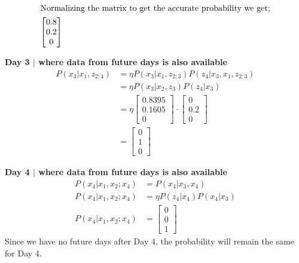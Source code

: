 \documentclass[answers]{exam}
\begin{document}
\begin{questions}
\begin{parts}
\begin{solution}
            \begin{align*} 
                \intertext{Normalizing the matrix to get the accurate probability we get;} 
                \begin{bmatrix} 0.8 \\ 0.2 \\ 0 \end{bmatrix}               
            \end{align*}
            
            \textbf{Day 3 $\mid$ where data from future days is also available}
            \begin{align*}
                P(x_3 | x_1, z_{2:4}) &= \eta P(x_3 | x_1, z_{2:3})P(z_4 | x_3, x_1, z_{2:3}) \\
                &= \eta P(x_3 | x_2, z_3)P(z_4 | x_3) \\
                &= \eta \begin{bmatrix}
                0.8395 \\
                0.1605 \\
                0
                \end{bmatrix} \cdot \begin{bmatrix}
                0 \\
                0.2 \\
                0
                \end{bmatrix} \\
                &= \begin{bmatrix}
                0 \\
                1 \\
                0
                \end{bmatrix}
            \end{align*}

            \textbf{Day 4 $\mid$ where data from future days is also available}
            \begin{align*}
                P(x_4 | x_1, x_2;x_4) &= P(x_4 | x_3, x_4) \\
                P(x_4 | x_1, x_2;x_4) &= \eta P(z_4 | x_4)P(x_4 | x_3) \\
                P(x_4 | x_1, x_2;x_4) &= \begin{bmatrix}
                0 \\
                0 \\
                1
                \end{bmatrix}
            \end{align*}
            Since we have no future days after Day 4, the probability will remain the same for Day 4. 
        \end{solution}                 
            

\end{parts}
\end{questions}
\end{document}
